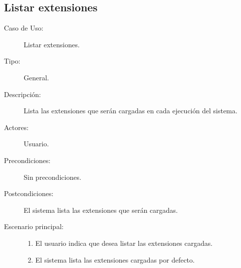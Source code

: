 \subsection{Listar extensiones}
\begin{framed}
\FloatBarrier
\begin{description}
   \item[Caso de Uso:]  Listar extensiones.
   \item[Tipo:] General.
   \item[Descripción:] 
   Lista las extensiones que serán cargadas en cada ejecución del sistema.
   \item[Actores:] 
   Usuario.
   \item[Precondiciones:] 
   Sin precondiciones.
   \item[Postcondiciones:] 
   El sistema lista las extensiones que serán cargadas.
   \item[Escenario principal:] \hfill
   \begin{enumerate}
   \item El usuario indica que desea listar las extensiones cargadas.
   \item El sistema lista las extensiones cargadas por defecto. 
   \end{enumerate}
\end{description}
 \FloatBarrier
\end{framed}

